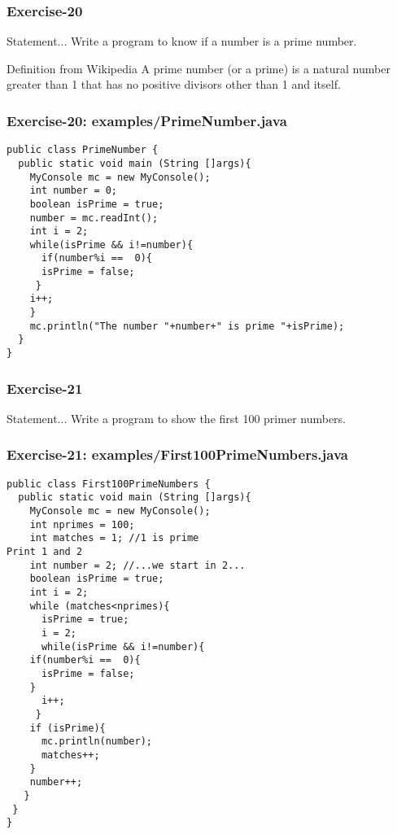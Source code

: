 \documentclass[xcolor=dvipsnames,dvip,notes=show,table]{beamer}
\begin{document}
\begin{frame}[fragile]
\frametitle{Exercise-20}
\begin{block}{Statement...}
Write a program to know if a number is a prime number.
\end{block}

\begin{exampleblock}{Definition from Wikipedia}
 A prime number (or a prime) is a natural number greater than 1 that has no positive divisors other than 1 and itself. 
\end{exampleblock}

\end{frame}


\begin{frame}[fragile]
\frametitle{Exercise-20: examples/PrimeNumber.java}
\scriptsize
\begin{lstlisting}
public class PrimeNumber {
  public static void main (String []args){
    MyConsole mc = new MyConsole();
    int number = 0;
    boolean isPrime = true;
    number = mc.readInt();
    int i = 2;
    while(isPrime && i!=number){
      if(number%i ==  0){
      isPrime = false;
     }
    i++;
    }
    mc.println("The number "+number+" is prime "+isPrime);
  }
}
\end{lstlisting}
\end{frame}




\begin{frame}[fragile]
\frametitle{Exercise-21}
\begin{block}{Statement...}
Write a program to show the first 100 primer numbers.
\end{block}

\end{frame}


\begin{frame}[fragile]
\frametitle{Exercise-21: examples/First100PrimeNumbers.java}
\scriptsize
\begin{lstlisting}
public class First100PrimeNumbers {
  public static void main (String []args){
    MyConsole mc = new MyConsole();
    int nprimes = 100;
    int matches = 1; //1 is prime
Print 1 and 2
    int number = 2; //...we start in 2...
    boolean isPrime = true;			
    int i = 2;
    while (matches<nprimes){
      isPrime = true;
      i = 2;
      while(isPrime && i!=number){
	if(number%i ==  0){
	  isPrime = false;
	}
      i++;
     }
    if (isPrime){
      mc.println(number);
      matches++;
    }
    number++;
   }
 }
}
\end{lstlisting}
\end{frame}
\end{document}
